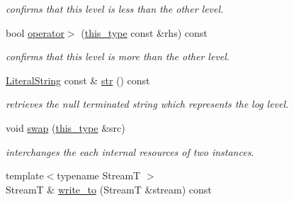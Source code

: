 \begin{DoxyCompactItemize}
\begin{DoxyCompactList}\small\item\em confirms that this level is less than the other level. \end{DoxyCompactList}\item 
\hypertarget{classhryky_1_1log_1_1level_1_1_entity_a5ab80c8f25b3a5a958deff9d6e21d086}{bool \hyperlink{classhryky_1_1log_1_1level_1_1_entity_a5ab80c8f25b3a5a958deff9d6e21d086}{operator$>$} (\hyperlink{classhryky_1_1log_1_1level_1_1_entity_a0d62d1d88c70320c6187fc9580077fea}{this\-\_\-type} const \&rhs) const }\label{classhryky_1_1log_1_1level_1_1_entity_a5ab80c8f25b3a5a958deff9d6e21d086}

\begin{DoxyCompactList}\small\item\em confirms that this level is more than the other level. \end{DoxyCompactList}\item 
\hypertarget{classhryky_1_1log_1_1level_1_1_entity_a610700e8acba66750fe4e32d8a36832c}{\hyperlink{classhryky_1_1_literal_string}{Literal\-String} const \& \hyperlink{classhryky_1_1log_1_1level_1_1_entity_a610700e8acba66750fe4e32d8a36832c}{str} () const }\label{classhryky_1_1log_1_1level_1_1_entity_a610700e8acba66750fe4e32d8a36832c}

\begin{DoxyCompactList}\small\item\em retrieves the null terminated string which represents the log level. \end{DoxyCompactList}\item 
\hypertarget{classhryky_1_1log_1_1level_1_1_entity_a7882840070ffabd547f2b5e0e462eebb}{void \hyperlink{classhryky_1_1log_1_1level_1_1_entity_a7882840070ffabd547f2b5e0e462eebb}{swap} (\hyperlink{classhryky_1_1log_1_1level_1_1_entity_a0d62d1d88c70320c6187fc9580077fea}{this\-\_\-type} \&src)}\label{classhryky_1_1log_1_1level_1_1_entity_a7882840070ffabd547f2b5e0e462eebb}

\begin{DoxyCompactList}\small\item\em interchanges the each internal resources of two instances. \end{DoxyCompactList}\item 
\hypertarget{classhryky_1_1log_1_1level_1_1_entity_aec2195adf72a8ac59a3bc065e1a6f1e9}{{\footnotesize template$<$typename Stream\-T $>$ }\\Stream\-T \& \hyperlink{classhryky_1_1log_1_1level_1_1_entity_aec2195adf72a8ac59a3bc065e1a6f1e9}{write\-\_\-to} (Stream\-T \&stream) const }\label{classhryky_1_1log_1_1level_1_1_entity_aec2195adf72a8ac59a3bc065e1a6f1e9}


\end{DoxyCompactItemize}
